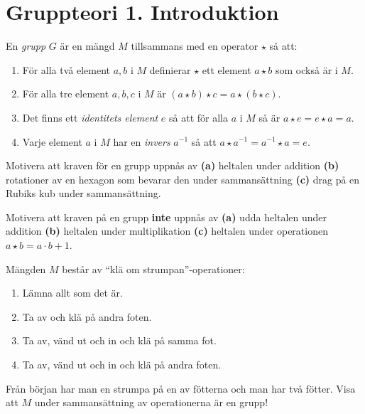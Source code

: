 \documentclass[11pt,fleqn]{book} %
\begin{document}
  \renewcommand*\rmdefault{ppl}\normalfont\upshape

\chapter{Gruppteori 1. Introduktion}
\large
\thispagestyle{empty}


\begin{definition} En \textit{grupp} \(G\) är en mängd \(M\) tillsammans med en operator \(\star \) så att:
  \begin{enumerate} %
    \item För alla två element \(a, b\) i \(M\) definierar \( \star \) ett element \(a  \star b\) som också är i \(M\).
    \item För alla tre element \(a, b, c\) i \(M\) är \((a  \star b)  \star c = a  \star (b  \star c)\).
    \item Det finns ett \textit{identitets element} \(e\) så att för alla \(a\) i \(M\) så är \(a  \star e = e  \star a = a\).
    \item Varje element \(a\) i \(M\) har en \textit{invers}  \(a ^{-1}\) så att \(a  \star a^{-1} = a^{-1}  \star a = e\).
  \end{enumerate}
\end{definition}

\begin{problem} Motivera att kraven för en grupp uppnås av
  \textbf{(a)} heltalen under addition \textbf{(b)} rotationer av en hexagon som bevarar den under sammansättning \textbf{(c)} drag på en Rubiks kub under sammansättning.
\end{problem}

\begin{problem} Motivera att kraven på en grupp \textbf{inte} uppnås av 
  \textbf{(a)} udda heltalen under addition \textbf{(b)} heltalen under multiplikation \textbf{(c)} heltalen under operationen \(a  \star b = a  \cdot b + 1\).
\end{problem}

\begin{problem}
  Mängden \(M\) består av ``klä om strumpan''-operationer:
  \begin{enumerate}
    \item Lämna allt som det är.
    \item Ta av och klä på andra foten.
    \item Ta av, vänd ut och in och klä på samma fot.
    \item Ta av, vänd ut och in och klä på andra foten.
  \end{enumerate}
  Från början har man en strumpa på en av fötterna och man har två fötter. Visa att \(M\) under sammansättning av operationerna är en grupp!
\end{problem}
\end{document}
